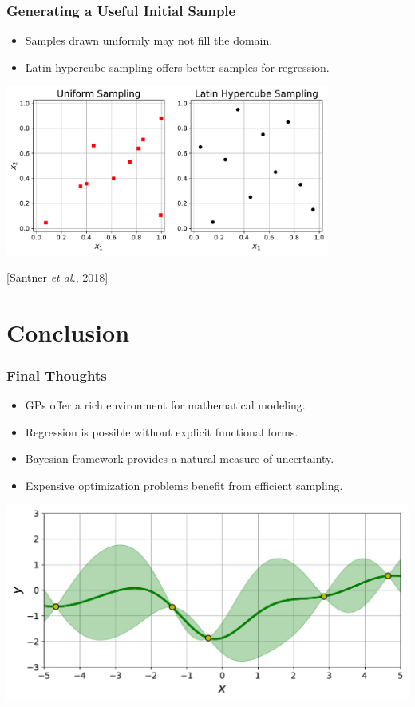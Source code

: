 \documentclass{beamer}
\newcommand{\citeAY}[1]{
	\begin{flushright}
		{\footnotesize [#1]}
	\end{flushright}
}
\begin{document}
	\begin{frame}
		\frametitle{Generating a Useful Initial Sample}
		\begin{itemize}
			\item Samples drawn uniformly may not fill the domain.
			\item Latin hypercube sampling offers better samples for regression.
		\end{itemize}
		\begin{center}
			\includegraphics[width=0.8\textwidth]{figures/09_sampling.pdf}
		\end{center}
		\citeAY{Santner \emph{et al.}, 2018}
	\end{frame}
	
	\section{Conclusion}
	\begin{frame}
		\frametitle{Final Thoughts}
		\begin{itemize}
			\item GPs offer a rich environment for mathematical modeling.
			\item Regression is possible without explicit functional forms.
			\item Bayesian framework provides a natural measure of uncertainty.
			\item Expensive optimization problems benefit from efficient sampling.
		\end{itemize}
		\vfill
		\begin{center}
			\includegraphics[scale=0.4]{figures/02b_posterior_distribution.pdf}
		\end{center}
	\end{frame}
	
\end{document}

